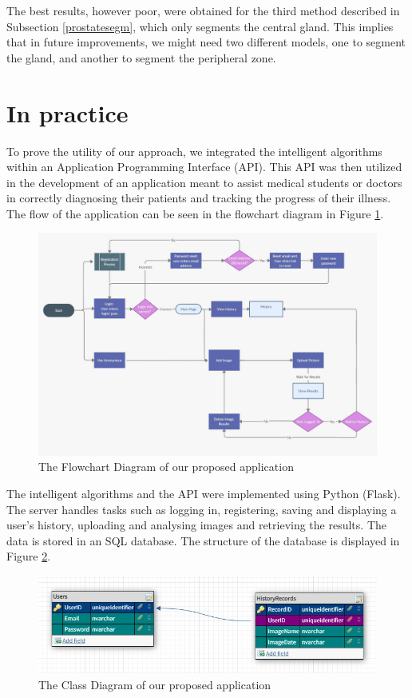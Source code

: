 \documentclass[runningheads,a4paper,11pt]{report}
\begin{document}
The best results, however poor, were obtained for the third method described in Subsection \ref{prostatesegm}, which only segments the central gland. This implies that in future improvements, we might need two different models, one to segment the gland, and another to segment the peripheral zone.

\section{In practice}
\label{section:practice}

To prove the utility of our approach, we integrated the intelligent algorithms within an Application Programming Interface (API). This API was then utilized in the development of an application meant to assist medical students or doctors in correctly diagnosing their patients and tracking the progress of their illness. The flow of the application can be seen in the flowchart diagram in Figure \ref{flowchart}.

\begin{figure}[htbp]
	\centerline{\includegraphics[width=17cm]{images/flow.jpg}}
	\caption{The Flowchart Diagram of our proposed application}
	\label{flowchart}
\end{figure}

The intelligent algorithms and the API were implemented using Python (Flask). The server handles tasks such as logging in, registering, saving and displaying a user's history, uploading and analysing images and retrieving the results. The data is stored in an SQL database. The structure of the database is displayed in Figure \ref{database}.

\begin{figure}[htbp]
	\centerline{\includegraphics[width=17cm]{images/database.jpeg}} 
	\caption{The Class Diagram of our proposed application}
	\label{database}
\end{figure}
\end{document}

